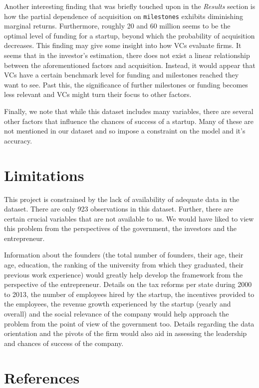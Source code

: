 \documentclass[
]{article}
\begin{document}
Another interesting finding that was briefly touched upon in the
\emph{Results} section is how the partial dependence of acquisition on
\texttt{milestones} exhibits diminishing marginal returns. Furthermore,
roughly 20 and 60 million seems to be the optimal level of funding for a
startup, beyond which the probability of acquisition decreases. This
finding may give some insight into how VCs evaluate firms. It seems that
in the investor's estimation, there does not exist a linear relationship
between the aforementioned factors and acquisition. Instead, it would
appear that VCs have a certain benchmark level for funding and
milestones reached they want to see. Past this, the significance of
further milestones or funding becomes less relevant and VCs might turn
their focus to other factors.

Finally, we note that while this dataset includes many variables, there
are several other factors that influence the chances of success of a
startup. Many of these are not mentioned in our dataset and so impose a
constraint on the model and it's accuracy.

\hypertarget{limitations}{%
\section{Limitations}\label{limitations}}

This project is constrained by the lack of availability of adequate data
in the dataset. There are only 923 observations in this dataset.
Further, there are certain crucial variables that are not available to
us. We would have liked to view this problem from the perspectives of
the government, the investors and the entrepreneur.

Information about the founders (the total number of founders, their age,
their age, education, the ranking of the university from which they
graduated, their previous work experience) would greatly help develop
the framework from the perspective of the entrepreneur. Details on the
tax reforms per state during 2000 to 2013, the number of employees hired
by the startup, the incentives provided to the employees, the revenue
growth experienced by the startup (yearly and overall) and the social
relevance of the company would help approach the problem from the point
of view of the government too. Details regarding the data orientation
and the pivots of the firm would also aid in assessing the leadership
and chances of success of the company.

\hypertarget{references}{%
\section{References}\label{references}}
\end{document}
